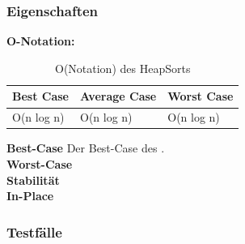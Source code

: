\documentclass{article}
\begin{document}
\subsubsection*{Eigenschaften}
\textbf{O-Notation:}
\begin{table}[h]
\centering
\begin{tabular}{lll}
	\hline
	\textbf{Best Case} & \textbf{Average Case} & \textbf{Worst Case} \\
	\hline
	O(n log n) & O(n log n) & O(n log n) \\
	\hline
\end{tabular}
\caption{O(Notation) des HeapSorts \cite{ONotationen}}
\label{tab:HeapSort}
\end{table}

\textbf{Best-Case} Der Best-Case des . \\
\textbf{Worst-Case} \\
\textbf{Stabilität}  \\

\textbf{In-Place}  \\
\subsubsection*{Testfälle}

\end{document}
